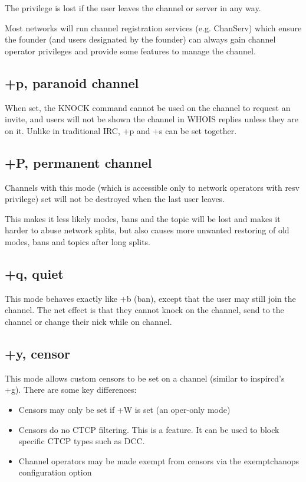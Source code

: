 	The privilege is lost if the user leaves the channel or server
	in any way.

	Most networks will run channel registration services (e.g. ChanServ)
	which ensure the founder (and users designated by the founder) can
	always gain channel operator privileges and provide some features to
	manage the channel.


\subsection{+p, paranoid channel}

	When set, the KNOCK command cannot be used on the channel to request an
	invite, and users will not be shown the	channel in WHOIS replies unless
	they are on it. Unlike in traditional IRC, +p and +s can be set
	together.


\subsection{+P, permanent channel}

	Channels with this mode (which is accessible only to network operators
	with resv privilege) set will not be destroyed when the last user
	leaves.

	This makes it less likely modes, bans and the topic will be lost and
	makes it harder to abuse network splits, but also causes more unwanted
	restoring of old modes, bans and topics after long splits.


\subsection{+q, quiet}

	This mode behaves exactly like +b (ban), except that the user may still
	join the channel. The net effect is that they cannot knock on the
	channel, send to the channel or change their nick while on channel.


\subsection{+y, censor}

	This mode allows custom censors to be set on a channel (similar to
	inspircd's +g). There are some key differences:
	\begin{itemize}

		\item{}%
		Censors may only be set if +W is set (an oper-{}only mode)

		\item{}%
		Censors do no CTCP filtering. This is a feature. It can be used
		to block specific CTCP types such as DCC.

		\item{}%
		Channel operators may be made exempt from censors via the
		exemptchanops configuration option
	\end{itemize}


